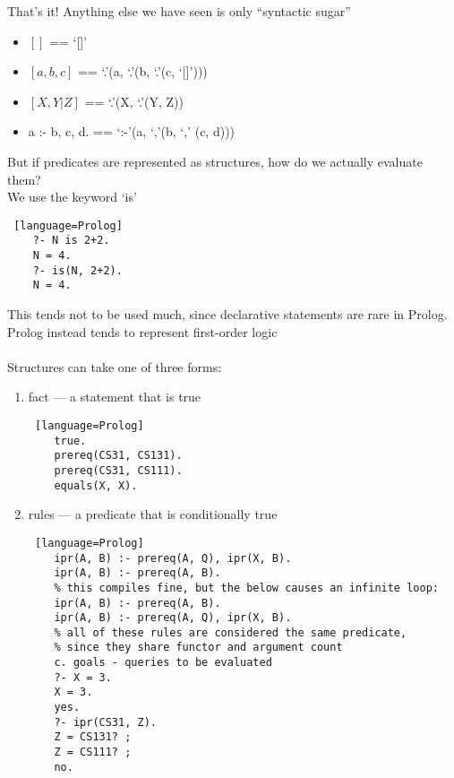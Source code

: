 \documentclass[../../lecture_notes.tex]{subfiles}
\begin{document}
\noindent That’s it! Anything else we have seen is only “syntactic sugar”
\begin{itemize} [itemsep=0mm]
	\item $[]$ == ‘[]’
	\item $[a, b, c]$ == ‘.’(a, ‘.’(b, ‘.’(c, ‘[]’)))
 	\item $[X, Y|Z]$ == ‘.’(X, ‘.’(Y, Z))
 	\item a :- b, c, d. == ‘:-’(a, ‘,’(b, ‘,’ (c, d)))
\end{itemize}
\noindent But if predicates are represented as structures, how do we actually evaluate them?\\
\indent We use the keyword ‘is’
\begin{lstlisting} [language=Prolog]
	?- N is 2+2.
	N = 4.
	?- is(N, 2+2).
	N = 4.
\end{lstlisting}
\noindent This tends not to be used much, since declarative statements are rare in Prolog.\\
Prolog instead tends to represent first-order logic\\
\\
Structures can take one of three forms:
\begin{enumerate}
\item fact — a statement that is true
\begin{lstlisting} [language=Prolog]
	true.
	prereq(CS31, CS131).
	prereq(CS31, CS111).
	equals(X, X).
\end{lstlisting}
\item rules — a predicate that is conditionally true
\begin{lstlisting} [language=Prolog]
	ipr(A, B) :- prereq(A, Q), ipr(X, B).
	ipr(A, B) :- prereq(A, B).
 	% this compiles fine, but the below causes an infinite loop:
 	ipr(A, B) :- prereq(A, B).
 	ipr(A, B) :- prereq(A, Q), ipr(X, B).
 	% all of these rules are considered the same predicate, 
 	% since they share functor and argument count
 	c. goals - queries to be evaluated
 	?- X = 3.
 	X = 3.
 	yes.
 	?- ipr(CS31, Z).
 	Z = CS131? ;
 	Z = CS111? ;
 	no.
\end{lstlisting} \medskip
\end{enumerate}
\end{document}
